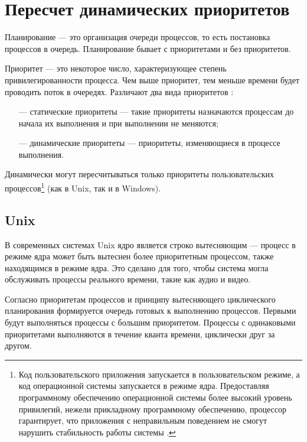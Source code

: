 \chapter{Пересчет динамических приоритетов}

Планирование \cite{cospect} --- это организация очереди процессов, то есть постановка процессов в очередь. Планирование бывает с приоритетами и без приоритетов.

Приоритет --- это некоторое число, характеризующее степень привилегированности процесса. Чем выше приоритет, тем меньше времени будет проводить поток в очередях. Различают два вида приоритетов \cite{cospect}:

\begin{itemize}
    \item[---] статические приоритеты --- такие приоритеты назначаются процессам до начала их выполнения и при выполнении не меняются;
    \item[---] динамические приоритеты --- приоритеты, изменяющиеся в процессе выполнения.
\end{itemize}

Динамически могут пересчитываться только приоритеты пользовательских процессов\footnote{Код пользовательского приложения запускается в пользовательском режиме, а код операционной системы запускается в режиме ядра. Предоставляя программному обеспечению операционной системы более высокий уровень привилегий, нежели прикладному программному обеспечению, процессор гарантирует, что приложения с неправильным поведением не смогут нарушить стабильность работы системы \cite{win5}.} (как в Unix, так и в Windows). 


\section{Unix}

В современных системах Unix ядро является строко вытесняющим --- процесс в режиме ядра может быть вытеснен более приоритетным процессом, также находящимся в режиме ядра. Это сделано для того, чтобы система могла обслуживать процессы реального времени, такие как аудио и видео.

Согласно приоритетам процессов и принципу вытесняющего циклического планирования формируется очередь готовых к выполнению процессов. Первыми будут выполняться процессы с большим приоритетом. Процессы с одинаковыми приоритетами выполняются в течение кванта времени, циклически друг за другом.

